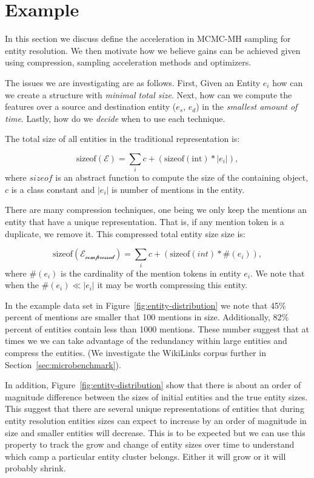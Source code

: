 
\section{Example}

In this section we discuss define the acceleration in MCMC-MH sampling for entity resolution.
We then motivate how we believe gains can be achieved given using compression, sampling acceleration methods and optimizers.

The issues we are investigating are as follows.
First, Given an Entity $e_i$ how can we create a structure with \textit{minimal total size}.
Next, how can we compute the features over a source and destination entity ($e_s$, $e_d$) 
in the \textit{smallest amount of time}.
Lastly, how do we \textit{decide} when to use each technique.


The total size of all entities in the traditional representation is:

\begin{equation}
  \text{sizeof}(\mathcal{E}) =  \sum_i c + (\text{sizeof}(\text{int}) * |e_i|),
\end{equation}
where $sizeof$ is an abstract function to compute the size of the containing object,
$c$ is a class constant and $|e_i|$ is number of mentions in the entity.

There are many compression techniques, one being we only keep the mentions an entity
that have a unique representation.
That is, if any mention token is a duplicate, we remove it.
This compressed total entity size size is:

\begin{equation}
  \text{sizeof}(\mathcal{E_\text{compressed}}) = \sum_i c + (\text{sizeof}(int) * \#(e_i) ),
\end{equation}
where $\#(e_i)$ is the cardinality of the mention tokens in entity $e_i$.
We note that when the $\#(e_i) \ll |e_i|$ it may be worth compressing this entity.


In the example data set in Figure~\ref{fig:entity-distribution} we note that
45\% percent of mentions are smaller that 100 mentions in size.
Additionally, 82\% percent of entities contain less than 1000 mentions.
These number suggest that at times we 
we can take advantage of the redundancy within
large entities and compress the entities.
(We investigate the WikiLinks corpus further in Section~\ref{sec:microbenchmark}). 



In addition, Figure~\ref{fig:entity-distribution} show that there is about an
order of magnitude difference between the sizes of initial entities and the
true entity sizes. This suggest that there are several unique representations
of entities that during entity resolution entities sizes can expect to increase
by an order of magnitude in size and smaller entities will decrease.
This is to be expected but we can use this property to track the grow and
change of entity sizes over time to understand which camp a particular entity
cluster belongs. Either it will grow or it will probably shrink.

